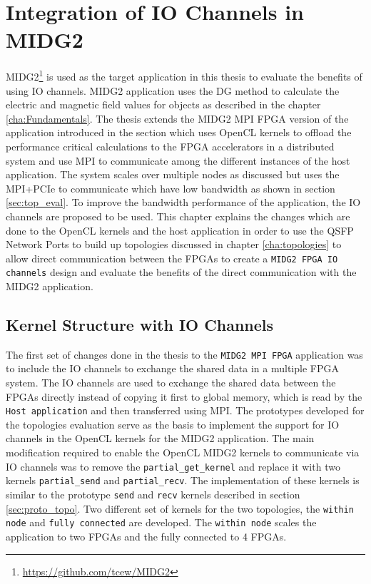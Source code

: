 \chapter{Integration of IO Channels in MIDG2}
\label{cha:sys_arch}

MIDG2\footnote{\url{https://github.com/tcew/MIDG2}} is used as the target
application in this thesis to evaluate the benefits of using IO channels.
MIDG2 application uses the \ac{DG} method to calculate the electric and magnetic
field values for objects as described in the chapter \ref{cha:Fundamentals}.
The thesis extends the MIDG2 \ac{MPI} FPGA version of the application introduced in the
section \label{sec:midge_mpi} which uses OpenCL kernels to
offload the performance critical calculations to the FPGA accelerators in a
distributed system and use MPI to communicate among the different instances of the
host application. The system scales over multiple nodes as discussed but
uses the \ac{MPI}+PCIe to communicate which have low bandwidth as shown in section
\ref{sec:top_eval}. To improve the bandwidth performance of the application,
the IO channels are proposed to be used. This chapter explains the changes
which are done to the OpenCL kernels and the host application in order to use
the QSFP Network Ports to build up topologies discussed in chapter
\ref{cha:topologies} to allow direct communication between the FPGAs to create a
\texttt{MIDG2 FPGA IO channels} design
and evaluate the benefits of the direct communication with the MIDG2 application.

\section{Kernel Structure with IO Channels}
\label{sec:struc_iochan}

The first set of changes done in the thesis to the \texttt{MIDG2 MPI FPGA} application
was to include the IO channels to exchange the shared data in a multiple FPGA system.
The IO channels are used to exchange the shared data between the FPGAs directly instead
of copying it first to global memory, which is read by the \texttt{Host application}
and then transferred using MPI. The prototypes developed for the topologies evaluation
serve as the basis to implement the support for IO channels in the OpenCL kernels for
the MIDG2 application. The main modification required to enable the OpenCL MIDG2
kernels to communicate via IO channels
was to remove the \texttt{partial\_get\_kernel} and replace it with two kernels
\texttt{partial\_send} and \texttt{partial\_recv}. The implementation of these kernels
is similar to the prototype \texttt{send} and \texttt{recv} kernels described in
section \ref{sec:proto_topo}. Two different set of kernels for the two topologies,
the \texttt{within node} and \texttt{fully connected} are developed. The \texttt{within node}
scales the application to two FPGAs and the fully connected to 4 FPGAs.

